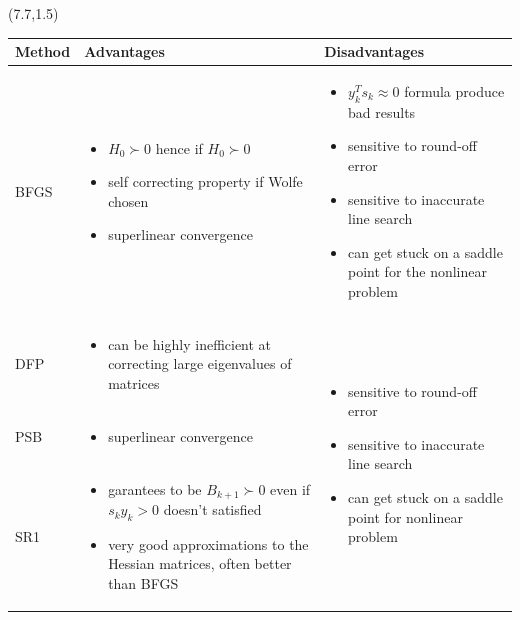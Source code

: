 \documentclass[a0]{a0poster}
\begin{document}
\begin{textblock}{7.1}(7.7,1.5)
\begin{flushleft}
	 \begin{tabular}{ p{3cm} |p{12cm} |p{12cm} }
	Method & Advantages & Disadvantages\\
	\hline
	BFGS & \begin{itemize}
		\item $H_0\succ 0$ hence if $H_0\succ 0$
		\item self correcting property if Wolfe chosen
		\item superlinear convergence
	\end{itemize} & \begin{itemize}
	\item $y_k^Ts_k \approx 0$ formula produce bad results
	\item sensitive to round-off error
	\item sensitive to inaccurate line search
	\item can get stuck on a saddle point for the nonlinear problem
\end{itemize}\\ 
	\hline
	DFP &  \begin{itemize}
		\item  can be highly inefficient at correcting
		large eigenvalues of matrices
	\end{itemize}&\multirow{3}{12cm}{
	\begin{itemize}
		\item sensitive to round-off error
		\item sensitive to inaccurate line search
		\item can get stuck on a saddle point for nonlinear problem
	\end{itemize}
	}\\
	\cline{1-2}
	PSB & \begin{itemize}
		\item superlinear convergence
	\end{itemize}\\
	\cline{1-2}
	SR1 & \begin{itemize}
		\item garantees to be $B_{k+1}\succ 0$ even if $s_k y_k > 0$ doesn't satisfied
		\item very good approximations to the  Hessian matrices, often better than BFGS
	\end{itemize} \\

\end{tabular}
	

\end{flushleft}
\end{textblock}
\end{document}
